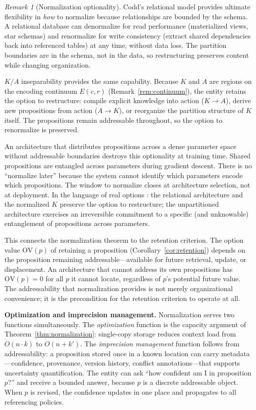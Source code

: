\documentclass[11pt]{article}
\theoremstyle{definition}
\theoremstyle{remark}
\newtheorem*{remark}{Remark}
\begin{document}
\begin{remark}[Normalization optionality]
\label{rem:optionality}
Codd's relational model provides ultimate flexibility in \emph{how}
to normalize because relationships are bounded by the schema. A
relational database can denormalize for read performance (materialized
views, star schemas) and renormalize for write consistency (extract
shared dependencies back into referenced tables) at any time, without
data loss. The partition boundaries are in the schema, not in the
data, so restructuring preserves content while changing organization.

$K/A$ inseparability provides the same capability. Because $K$ and
$A$ are regions on the encoding continuum $E(c,r)$
(Remark~\ref{rem:continuum}), the entity retains the option to
restructure: compile explicit knowledge into action ($K \to A$),
derive new propositions from action ($A \to K$), or reorganize the
partition structure of $K$ itself. The propositions remain
addressable throughout, so the option to renormalize is preserved.

An architecture that distributes propositions across a dense parameter
space without addressable boundaries destroys this optionality at
training time. Shared propositions are entangled across parameters
during gradient descent. There is no ``normalize later'' because the
system cannot identify which parameters encode which propositions.
The window to normalize closes at architecture selection, not at
deployment. In the language of real options
\cite{DixitPindyck1994}: the relational architecture and the
normalized $K$ preserve the option to restructure; the unpartitioned
architecture exercises an irreversible commitment to a specific
(and unknowable) entanglement of propositions across parameters.

This connects the normalization theorem to the retention criterion.
The option value $\mathrm{OV}(p)$ of retaining a proposition
(Corollary~\ref{cor:retention}) depends on the proposition remaining
addressable---available for future retrieval, update, or
displacement. An architecture that cannot address its own
propositions has $\mathrm{OV}(p) = 0$ for all $p$ it cannot locate,
regardless of $p$'s potential future value. The addressability
that normalization provides is not merely organizational convenience;
it is the precondition for the retention criterion to operate at all.

\textbf{Optimization and imprecision management.}
Normalization serves two functions simultaneously. The
\emph{optimization} function is the capacity argument of
Theorem~\ref{thm:normalization}: single-copy storage reduces context
load from $O(n \cdot k)$ to $O(n + k')$. The \emph{imprecision
management} function follows from addressability: a proposition stored
once in a known location can carry metadata---confidence, provenance,
version history, conflict annotations---that supports uncertainty
quantification. The entity can ask ``how confident am I in
proposition $p$?'' and receive a bounded answer, because $p$ is a
discrete addressable object. When $p$ is revised, the confidence
updates in one place and propagates to all referencing policies.


\end{remark}
\end{document}
